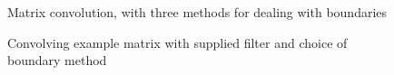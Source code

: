 \begin{figure}
   \small
   
   \caption{Matrix convolution, with three methods for dealing with boundaries}
   \small
   
   \caption{Convolving example matrix with supplied filter and choice of boundary method}
\end{figure}
